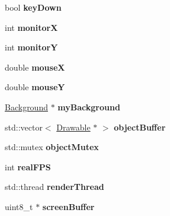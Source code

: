 \begin{DoxyCompactItemize}
\item 
\mbox{\label{classtsgl_1_1_canvas_a11ca1057dd0ac4a22299ec27359beda1}} 
bool {\bfseries key\+Down}
\item 
\mbox{\label{classtsgl_1_1_canvas_a0b8d1dfdf834bee9b6329552dc54d2d9}} 
int {\bfseries monitorX}
\item 
\mbox{\label{classtsgl_1_1_canvas_a4024df92dc27620de7a1770184cf8a96}} 
int {\bfseries monitorY}
\item 
\mbox{\label{classtsgl_1_1_canvas_af53e97be8e4562d92b5edd06fa8969cc}} 
double {\bfseries mouseX}
\item 
\mbox{\label{classtsgl_1_1_canvas_a204a15bdf12485ee1019982f0aa78155}} 
double {\bfseries mouseY}
\item 
\mbox{\label{classtsgl_1_1_canvas_ae046053082e91b91723ccbabaa59f896}} 
\hyperlink{classtsgl_1_1_background}{Background} $\ast$ {\bfseries my\+Background}
\item 
\mbox{\label{classtsgl_1_1_canvas_afa78a0914a742067ffa0a0612ab947dd}} 
std\+::vector$<$ \hyperlink{classtsgl_1_1_drawable}{Drawable} $\ast$ $>$ {\bfseries object\+Buffer}
\item 
\mbox{\label{classtsgl_1_1_canvas_a5af34265949ab9777acc2cd2e0c188bc}} 
std\+::mutex {\bfseries object\+Mutex}
\item 
\mbox{\label{classtsgl_1_1_canvas_a089def4ec8f38575a8ba779ce899fc9a}} 
int {\bfseries real\+F\+PS}
\item 
\mbox{\label{classtsgl_1_1_canvas_ad4b53a7c274d1c2b5fdaa793e38ca849}} 
std\+::thread {\bfseries render\+Thread}
\item 
\mbox{\label{classtsgl_1_1_canvas_a8c110c0df90b2fb2ae2ee239d31aca0b}} 
uint8\+\_\+t $\ast$ {\bfseries screen\+Buffer}
\item 
\mbox{\label{classtsgl_1_1_canvas_a144385fc573bfeef680d168d4eeef0c0}} 

\end{DoxyCompactItemize}
